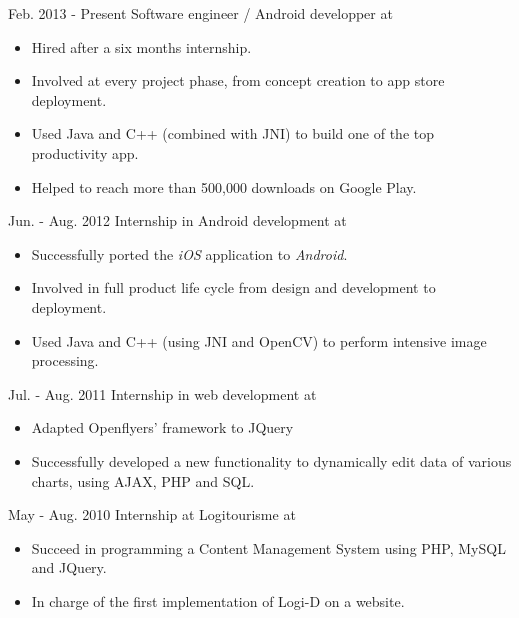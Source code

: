 \cventry
{Feb. 2013 - Present}
{Software engineer / Android developper }
{at }
{}
{}
{
	\begin{itemize}
		\item Hired after a six months internship.
		\item Involved at every project phase, from concept creation to app store deployment.
		\item Used Java and C++ (combined with JNI) to build one of the top productivity app.
		\item Helped to reach more than 500,000 downloads on Google Play.
	\end{itemize}
}

\cventry
{Jun. - Aug. 2012}
{Internship in Android development}
{at }
{}
{}
{
	\begin{itemize}
		\item Successfully ported the \textit{iOS} application to \textit{Android}.
		\item Involved in full product life cycle from design and development to deployment.
		\item Used Java and C++ (using JNI and OpenCV) to perform intensive image processing.
	\end{itemize}
}

\cventry
{Jul. - Aug. 2011}
{Internship in web development}
{at }
{}
{}
{
	\begin{itemize}
		\item Adapted Openflyers' framework to JQuery
		\item Successfully developed a new functionality to dynamically edit data of various charts, using AJAX, PHP and SQL.
	\end{itemize}
}

\cventry
{May - Aug. 2010}
{Internship at Logitourisme}
{at }
{}
{}
{
	\begin{itemize}
		\item Succeed in programming a Content Management System using PHP, MySQL and JQuery.
		\item In charge of the first implementation of Logi-D on a website. 
	\end{itemize}
}